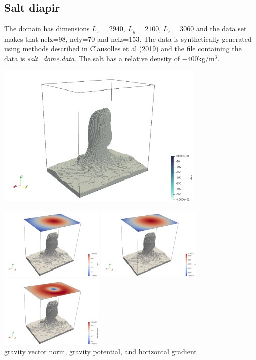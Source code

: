 \newpage
\subsection*{Salt diapir}


The domain has dimensions $L_x=2940$, $L_y=2100$, $L_z=3060$ and the data set makes that  
nelx=98, nely=70 and nelz=153. The data is
synthetically generated using methods described in 
Clausolles et al (2019) \cite{clcc19}
and the file containing the data is {\sl salt\_dome.data}.
The salt has a relative density of $-400\si{\kg\per\cubic\metre}$.

\begin{center}
\includegraphics[width=10cm]{python_codes/fieldstone_84/diapir/diapir.png}
\end{center}


\begin{center}
\includegraphics[width=5cm]{python_codes/fieldstone_84/diapir/g.png}
\includegraphics[width=5cm]{python_codes/fieldstone_84/diapir/U.png}
\includegraphics[width=5cm]{python_codes/fieldstone_84/diapir/horgrad.png}\\
{\captionfont gravity vector norm, gravity potential, and horizontal gradient}
\end{center}


